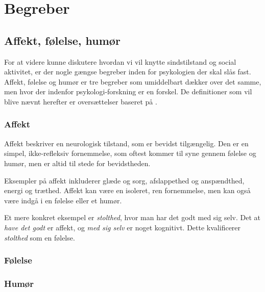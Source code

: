 \section{Begreber}

\subsection{Affekt, følelse, humør}
For at videre kunne diskutere hvordan vi vil knytte sindstilstand og social aktivitet, er der nogle gængse begreber inden for psykologien der skal slås fast.
Affekt, følelse og humør er tre begreber som umiddelbart dækker over det samme, men hvor der indenfor psykologi-forskning er en forskel.
De definitioner som vil blive nævnt herefter er oversættelser baseret på \citet{ekkekakis}.

\subsubsection{Affekt}
Affekt beskriver en neurologisk tilstand, som er bevidst tilgængelig.
Den er en simpel, ikke-refleksiv fornemmelse, som oftest kommer til syne gennem følelse og humør, men er altid til stede for bevidstheden.

Eksempler på affekt inkluderer glæde og sorg, afslappethed og anspændthed, energi og træthed.
Affekt kan være en isoleret, ren fornemmelse, men kan også være indgå i en følelse eller et humør.

Et mere konkret eksempel er \textit{stolthed}, hvor man har det godt med sig selv.
Det at \textit{have det godt} er affekt, og \textit{med sig selv} er noget kognitivt.
Dette kvalificerer \textit{stolthed} som en følelse.

\subsubsection{Følelse}


\subsubsection{Humør}
